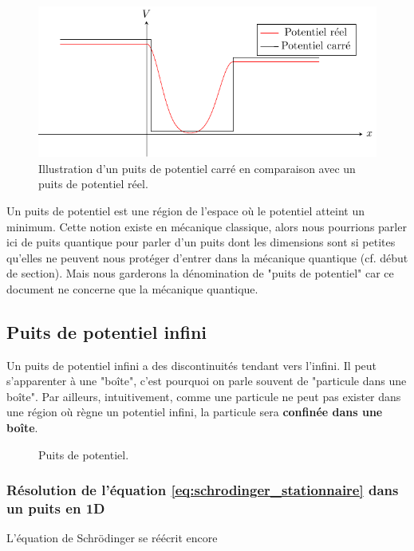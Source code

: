 \begin{figure}[h]
\centering
\includegraphics[width=0.5\linewidth]{images/pot_carre.pdf}
\caption{Illustration d'un puits de potentiel carré en comparaison avec un puits de potentiel réel.}
\label{fig:potentiel_carre}
\end{figure}

Un puits de potentiel est une région de l'espace où le potentiel atteint un minimum. Cette notion existe en mécanique classique, alors nous pourrions parler ici de puits quantique pour parler d'un puits dont les dimensions sont si petites qu'elles ne peuvent nous protéger d'entrer dans la mécanique quantique (cf. début de section). Mais nous garderons la dénomination de "puits de potentiel" car ce document ne concerne que la mécanique quantique. \\


\subsection{Puits de potentiel infini}
Un puits de potentiel infini a des discontinuités tendant vers l'infini. Il peut s'apparenter à une "boîte", c'est pourquoi on parle souvent de "particule dans une boîte". Par ailleurs, intuitivement, comme une particule ne peut pas exister dans une région où règne un potentiel infini, la particule sera \textbf{confinée dans une boîte}.
\begin{figure}[h]
\centering
\scalebox{1}{}
\caption{Puits de potentiel.}
\label{fig:puits_potentiel}
\end{figure}
\subsubsection{Résolution de l'équation \eqref{eq:schrodinger_stationnaire} dans un puits en 1D}
L'équation de Schrödinger se réécrit encore 


